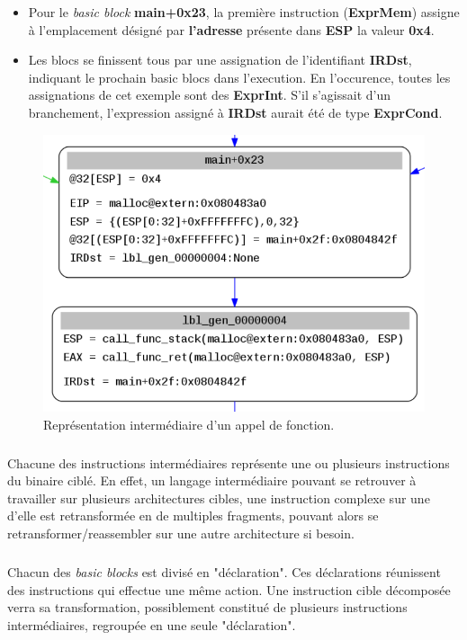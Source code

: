 \begin{itemize}
    \item Pour le \textit{basic block} \textbf{main+0x23}, la première instruction (\textbf{ExprMem}) assigne à l'emplacement désigné par \textbf{l'adresse}
        présente dans \textbf{ESP} la valeur \textbf{0x4}.
    \item Les blocs se finissent tous par une assignation de l'identifiant \textbf{IRDst}, indiquant le prochain basic blocs dans l'execution.
        En l'occurence, toutes les assignations de cet exemple sont des \textbf{ExprInt}. S'il s'agissait d'un branchement, l'expression assigné à \textbf{IRDst}
        aurait été de type \textbf{ExprCond}.
\end{itemize}
\begin{figure}[h]
    \centering
    \includegraphics[scale=0.3]{ir.png}\newline
    \caption{Représentation intermédiaire d'un appel de fonction.}
\end{figure}
\subparagraph{}
Chacune des instructions intermédiaires représente une ou plusieurs instructions du binaire ciblé. En effet, un langage intermédiaire
pouvant se retrouver à travailler sur plusieurs architectures cibles, une instruction complexe sur une d'elle est retransformée en de multiples
fragments, pouvant alors se retransformer/reassembler sur une autre architecture si besoin.
\subparagraph{}
Chacun des \textit{basic blocks} est divisé en "déclaration". Ces déclarations réunissent des instructions qui effectue une même action. Une instruction cible décomposée
verra sa transformation, possiblement constitué de plusieurs instructions intermédiaires, regroupée en une seule "déclaration".



